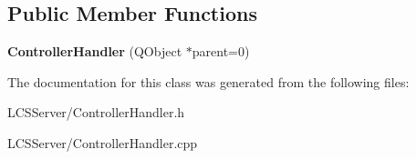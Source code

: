 \subsection*{Public Member Functions}
\begin{DoxyCompactItemize}
\item 
\mbox{\label{class_controller_handler_a10fdee0ade1b42a540cecc0d1205771d}} 
{\bfseries Controller\+Handler} (Q\+Object $\ast$parent=0)
\end{DoxyCompactItemize}


The documentation for this class was generated from the following files\+:\begin{DoxyCompactItemize}
\item 
L\+C\+S\+Server/Controller\+Handler.\+h\item 
L\+C\+S\+Server/Controller\+Handler.\+cpp\end{DoxyCompactItemize}
